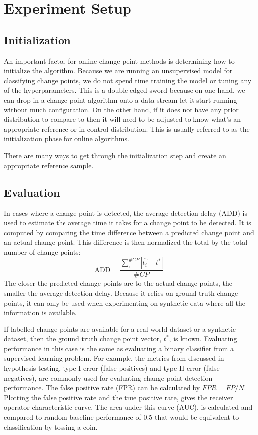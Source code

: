 \section{Experiment Setup}

\subsection{Initialization}
An important factor for online change point methods is determining how to initialize the algorithm. Because we are running an unsupervised model for classifying change points, we do not spend time training the model or tuning any of the hyperparameters. This is a double-edged sword because on one hand, we can drop in a change point algorithm onto a data stream let it start running without much configuration. On the other hand, if it does not have any prior distribution to compare to then it will need to be adjusted to know what's an appropriate reference or in-control distribution. This is usually referred to as the initialization phase for online algorithms.

There are many ways to get through the initialization step and create an appropriate reference sample.



\subsection{Evaluation}
In cases where a change point is detected, the average detection delay (ADD) is used to estimate the average time it takes for a change point to be detected. It is computed by comparing the time difference between a predicted change point and an actual change point. This difference is then normalized the total by the total number of change points:
\begin{equation}
\text{ADD} = \frac{\sum_i^{\#CP} |\hat{t_i} - t^*|}{\#CP}
\end{equation}
The closer the predicted change points are to the actual change points, the smaller the average detection delay. Because it relies on ground truth change points, it can only be used when experimenting on synthetic data where all the information is available.%

If labelled change points are available for a real world dataset or a synthetic dataset, then the ground truth change point vector, 
$t^*$, is known. Evaluating performance in this case is the same as evaluating a binary classifier from a supervised learning problem. For example, the metrics from discussed in hypothesis testing, type-I error (false positives) and type-II error (false negatives), are commonly used for evaluating change point detection performance. The false positive rate (FPR) can be calculated by $FPR = FP / N$. Plotting the false positive rate and the true positive rate, gives the receiver operator characteristic curve. The area under this curve (AUC), is calculated and compared to random baseline performance of 0.5 that would be equivalent to classification by tossing a coin.


